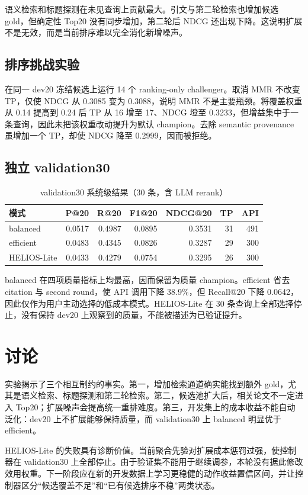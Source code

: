\documentclass[a4paper,11pt]{ctexart}
\begin{document}
语义检索和标题探测在未见查询上贡献最大。引文与第二轮检索也增加候选 gold，但确定性 Top20 没有同步增加，第二轮后 NDCG 还出现下降。这说明扩展不是无效，而是当前排序难以完全消化新增噪声。

\subsection{排序挑战实验}
在同一 dev20 冻结候选上运行 14 个 ranking-only challenger。取消 MMR 不改变 TP，仅使 NDCG 从 0.3085 变为 0.3088，说明 MMR 不是主要瓶颈。将覆盖权重从 0.14 提高到 0.24 后 TP 从 16 增至 17、NDCG 墱至 0.3233，但增益集中于一条查询，因此未把该权重改动提升为默认 champion。去除 semantic provenance 虽增加一个 TP，却使 NDCG 降至 0.2999，因而被拒绝。

\subsection{独立 validation30}
\begin{table}[ht]
\centering\caption{validation30 系统级结果（30 条，含 LLM rerank）}
\begin{tabular}{lrrrrrr}\toprule
模式 & P@20 & R@20 & F1@20 & NDCG@20 & TP & API\\\midrule
balanced & 0.0517 & 0.4987 & 0.0895 & 0.3531 & 31 & 491\\
efficient & 0.0483 & 0.4345 & 0.0826 & 0.3287 & 29 & 300\\
HELIOS-Lite & 0.0433 & 0.4279 & 0.0754 & 0.3295 & 26 & 300\\\bottomrule
\end{tabular}
\end{table}

balanced 在四项质量指标上均最高，因而保留为质量 champion。efficient 省去 citation 与 second round，使 API 调用下降 38.9\%，但 Recall@20 下降 0.0642，因此仅作为用户主动选择的低成本模式。HELIOS-Lite 在 30 条查询上全部选择停止，没有保持 dev20 上观察到的质量，不能被描述为已验证提升。

\section{讨论}
实验揭示了三个相互制约的事实。第一，增加检索通道确实能找到额外 gold，尤其是语义检索、标题探测和第二轮检索。第二，候选池扩大后，相关论文不一定进入 Top20；扩展噪声会提高统一重排难度。第三，开发集上的成本收益不能自动泛化：dev20 上不扩展能够保持质量，而 validation30 上 balanced 明显优于 efficient。

HELIOS-Lite 的失败具有诊断价值。当前聚合先验对扩展成本惩罚过强，使控制器在 validation30 上全部停止。由于验证集不能用于继续调参，本轮没有据此修改效用权重。下一阶段应在新的开发数据上学习更稳健的动作收益置信区间，并让控制器区分“候选覆盖不足”和“已有候选排序不稳”两类状态。
\end{document}
